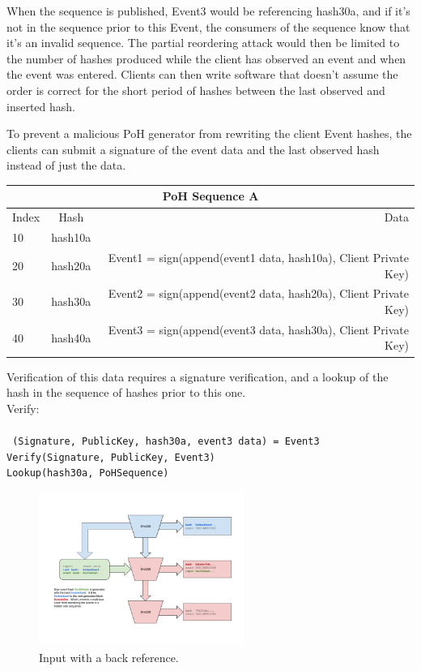 \documentclass[12pt]{article}
\begin{document}
When the sequence is published, Event3 would be referencing hash30a, and if it’s not in the sequence prior to this Event, the consumers of the sequence know that it’s an invalid sequence. The partial reordering attack would then be limited to the number of hashes produced while the client has observed an event and when the event was entered. Clients can then write software that doesn’t assume the order is correct for the short period of hashes between the last observed and inserted hash.

To prevent a malicious PoH generator from rewriting the client Event hashes, the clients can submit a signature of the event data and the last observed hash instead of just the data.\\
\begin{center}
  \begin{tabular}{ | l | c | r |}
    \hline
    \multicolumn{3}{|c|}{PoH Sequence A} \\
    \hline
    Index & Hash & Data \\ \hline
    10 & hash10a & \\ \hline
    20 & hash20a & Event1 = sign(append(event1 data, hash10a), Client Private Key) \\ \hline
    30 & hash30a & Event2 = sign(append(event2 data, hash20a), Client Private Key) \\ \hline
    40 & hash40a & Event3 = sign(append(event3 data, hash30a), Client Private Key) \\
    \hline
    \end{tabular}
\end{center}

Verification of this data requires a signature verification, and a lookup of the hash in the sequence of hashes prior to this one.\\
\noindent Verify:\\\\\noindent
\texttt{
    (Signature, PublicKey, hash30a, event3 data) = Event3 \\
    Verify(Signature, PublicKey, Event3)\\
    Lookup(hash30a, PoHSequence)
}

\begin{figure}
  \begin{center}
    \centering
    \includegraphics[width=0.6\textwidth]{figures/fig_6.png}
    \caption[Fig 6]{Input with a back reference.\label{fig:poh_consistency}}
  \end{center}
  \end{figure}
\end{document}
